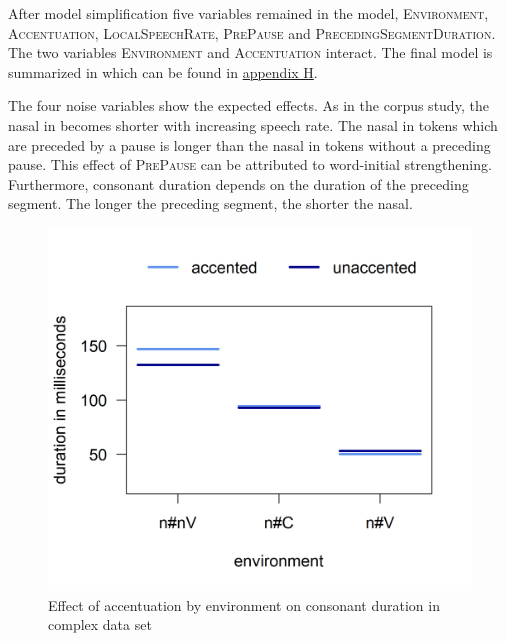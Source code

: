 After model simplification five variables remained in the model, \textsc{Environment}, \textsc{Accentuation}, \textsc{LocalSpeechRate}, \textsc{PrePause} and \textsc{PrecedingSegmentDuration}. The two variables \textsc{Environment} and \textsc{Accentuation} interact. The final model is summarized in  which can be found in \hyperref[Appendix H: Model Summaries Experiment]{appendix H}.


The four noise variables show the expected effects. As in the corpus study, the nasal in  becomes shorter with increasing speech rate. 
The nasal in tokens which are preceded by a pause is longer than the nasal in tokens without a preceding pause. This effect of \textsc{PrePause}  can be attributed to word-initial strengthening.  
Furthermore, consonant duration depends on the duration of the preceding segment. The longer the preceding segment, the shorter the nasal. 

\begin{figure} [t!]
	\centering
	\includegraphics [scale=0.5] {images/Experiment/unModelInterCatAcc}
	\caption{Effect of accentuation by environment on consonant duration in complex data set}
	\label{fig:NumNasal unComplex experiment}
\end{figure}


